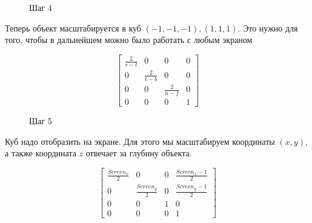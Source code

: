 \documentclass{article}
\begin{document}
\begin{center}
\begin{figure}[H]
\caption{Шаг 4}
\label{ris:image}
\end{figure}
\end{center}

Теперь объект масштабируется в куб $(-1, -1, -1), (1, 1, 1)$. Это нужно для того, чтобы в дальнейшем можно было работать с любым экраном

$$
\begin{bmatrix}
\frac{2}{r - l} & 0 & 0 & 0 \\ 
0 & \frac{2}{t - b} & 0 & 0 \\
0 & 0 & \frac{2}{n - f} & 0 \\
0 & 0 & 0 & 1\end{bmatrix}
$$					  

\begin{center}
\begin{figure}[H]
\caption{Шаг 5}
\label{ris:image}
\end{figure}
\end{center}


Куб надо отобразить на экране. Для этого мы масштабируем координаты $(x, y)$, а также координата $z$ отвечает за глубину объекта.

$$
\begin{bmatrix}\frac{Screen_x}{2} & 0 & 0 & \frac{Screen_x - 1}{2} \\ 
0 & \frac{Screen_y}{2} & 0 & \frac{Screen_y - 1}{2} \\
0 & 0 & 1 & 0 \\
0 & 0 & 0 & 1\end{bmatrix}
$$
\end{document}

